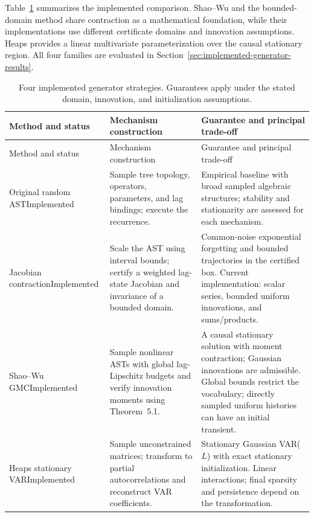 Table~\ref{tab:four-generator-strategies} summarizes the implemented
comparison. Shao--Wu and the bounded-domain method share contraction as a
mathematical foundation, while their implementations use different certificate
domains and innovation assumptions. Heaps provides a linear multivariate
parameterization over the causal stationary region. All four families are
evaluated in Section~\ref{sec:implemented-generator-results}.

\begingroup
\small
\renewcommand{\arraystretch}{1.12}
\begin{longtable}{@{}
>{\raggedright\arraybackslash}p{}
>{\raggedright\arraybackslash}p{}
>{\raggedright\arraybackslash}p{}@{}}
\caption{Four implemented generator strategies. Guarantees apply
under the stated domain, innovation, and initialization assumptions.}
\label{tab:four-generator-strategies}\\
\toprule
Method and status & Mechanism construction & Guarantee and principal trade-off\\
\midrule
\endfirsthead
\toprule
Method and status & Mechanism construction & Guarantee and principal trade-off\\
\midrule
\endhead
\bottomrule
\endlastfoot
Original random AST\newline Implemented &
Sample tree topology, operators, parameters, and lag bindings; execute the
recurrence. &
Empirical baseline with broad sampled algebraic structures; stability and
stationarity are assessed for each mechanism.\\
\addlinespace
Jacobian contraction\newline Implemented &
Scale the AST using interval bounds; certify a weighted lag-state Jacobian
and invariance of a bounded domain. &
Common-noise exponential forgetting and bounded trajectories in the certified
box. Current implementation: scalar series, bounded uniform innovations,
and sums/products.\\
\addlinespace
Shao--Wu GMC\newline Implemented &
Sample nonlinear ASTs with global lag-Lipschitz budgets and verify innovation
moments using Theorem~5.1. &
A causal stationary solution with moment contraction; Gaussian innovations
are admissible. Global bounds restrict the vocabulary; directly sampled
uniform histories can have an initial transient.\\
\addlinespace
Heaps stationary VAR\newline Implemented &
Sample unconstrained matrices; transform to partial autocorrelations and
reconstruct VAR coefficients. &
Stationary Gaussian VAR($L$) with exact stationary initialization. Linear
interactions; final sparsity and persistence depend on the transformation.\\
\end{longtable}
\endgroup

